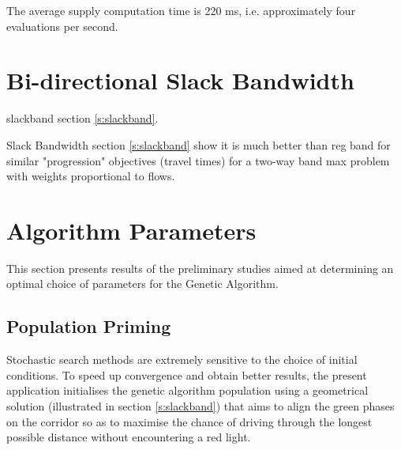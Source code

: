 The average supply computation time is 220 ms, i.e. approximately four evaluations per second.







\section{Bi-directional Slack Bandwidth}
slackband section \ref{s:slackband}.



Slack Bandwidth section \ref{s:slackband} show it is much better than reg band for similar "progression" objectives (travel times) for a two-way band max problem with weights proportional to flows. 

\section{Algorithm Parameters}
This section presents results of the preliminary studies aimed at determining an optimal choice of parameters for the Genetic Algorithm.

\subsection{Population Priming} \label{s:poppriming}
Stochastic search methods are extremely sensitive to the choice of initial conditions. To speed up convergence and obtain better results, the present application initialises the genetic algorithm population using a geometrical solution (illustrated in section \ref{s:slackband}) that aims to align the green phases on the corridor so as to maximise the chance of driving through the longest possible distance without encountering a red light.

